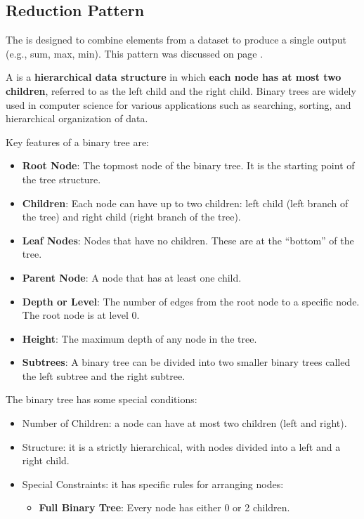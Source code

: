 \subsection{Reduction Pattern}

The  is designed to combine elements from a dataset to produce a single output (e.g., sum, max, min). This pattern was discussed on page \pageref{subsubsection: Reduce (or Reduction) Pattern}.

\begin{remarkbox}
    A  is a \textbf{hierarchical data structure} in which \textbf{each node has at most two children}, referred to as the left child and the right child. Binary trees are widely used in computer science for various applications such as searching, sorting, and hierarchical organization of data.

    Key features of a binary tree are:
    \begin{itemize}
        \item \textbf{Root Node}: The topmost node of the binary tree. It is the starting point of the tree structure.
        \item \textbf{Children}: Each node can have up to two children: left child (left branch of the tree) and right child (right branch of the tree).
        \item \textbf{Leaf Nodes}: Nodes that have no children. These are at the ``bottom'' of the tree.
        \item \textbf{Parent Node}: A node that has at least one child.
        \item \textbf{Depth or Level}: The number of edges from the root node to a specific node. The root node is at level 0.
        \item \textbf{Height}: The maximum depth of any node in the tree.
        \item \textbf{Subtrees}: A binary tree can be divided into two smaller binary trees called the left subtree and the right subtree.
    \end{itemize}

    The binary tree has some special conditions:
    \begin{itemize}
        \item Number of Children: a node can have at most two children (left and right).
        \item Structure: it is a strictly hierarchical, with nodes divided into a left and a right child.
        \item Special Constraints: it has specific rules for arranging nodes:
        \begin{itemize}
            \item \textbf{Full Binary Tree}: Every node has either 0 or 2 children.
            

\end{itemize}
\end{itemize}
\end{remarkbox}
